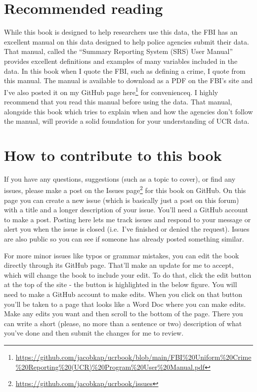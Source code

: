 \documentclass[
]{krantz}
\renewcommand{\href}[2]{#2\footnote{\url{#1}}}
\begin{document}
\section{Recommended reading}\label{recommended-reading}

While this book is designed to help researchers use this
data, the FBI has an excellent manual on this data designed
to help police agencies submit their data. That manual,
called the ``Summary Reporting System (SRS) User Manual''
provides excellent definitions and examples of many
variables included in the data. In this book when I quote
the FBI, such as defining a crime, I quote from this manual.
The manual is available to download as a PDF on the FBI's
site and I've also posted it on my GitHub page
\href{https://github.com/jacobkap/ucrbook/blob/main/FBI\%20Uniform\%20Crime\%20Reporting\%20(UCR)\%20Program\%20User\%20Manual.pdf}{here}
for convenienceq. I highly recommend that you read this
manual before using the data. That manual, alongside this
book which tries to explain when and how the agencies don't
follow the manual, will provide a solid foundation for your
understanding of UCR data.

\section{How to contribute to this
book}\label{how-to-contribute-to-this-book}

If you have any questions, suggestions (such as a topic to
cover), or find any issues, please make a post on the
\href{https://github.com/jacobkap/ucrbook/issues}{Issues
page} for this book on GitHub. On this page you can create a
new issue (which is basically just a post on this forum)
with a title and a longer description of your issue. You'll
need a GitHub account to make a post. Posting here lets me
track issues and respond to your message or alert you when
the issue is closed (i.e.~I've finished or denied the
request). Issues are also public so you can see if someone
has already posted something similar.

For more minor issues like typos or grammar mistakes, you
can edit the book directly through its GitHub page. That'll
make an update for me to accept, which will change the book
to include your edit. To do that, click the edit button at
the top of the site - the button is highlighted in the below
figure. You will need to make a GitHub account to make
edits. When you click on that button you'll be taken to a
page that looks like a Word Doc where you can make edits.
Make any edits you want and then scroll to the bottom of the
page. There you can write a short (please, no more than a
sentence or two) description of what you've done and then
submit the changes for me to review.
\end{document}
